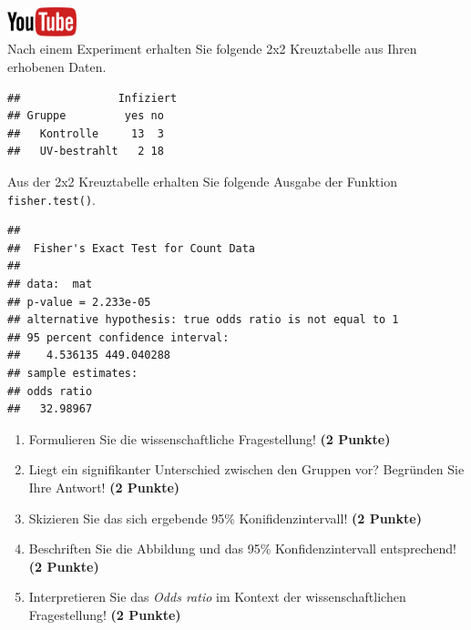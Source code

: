 \documentclass[a4paper, 9pt]{scrartcl}\usepackage[]{graphicx}\usepackage[]{xcolor}
\makeatletter
\newenvironment{kframe}{%
 \def\at@end@of@kframe{}%
 \ifinner\ifhmode%
  \def\at@end@of@kframe{\end{minipage}}%
  \begin{minipage}{\columnwidth}%
 \fi\fi%
 \def\FrameCommand##1{\hskip\@totalleftmargin \hskip-\fboxsep
 \colorbox{shadecolor}{##1}\hskip-\fboxsep
     \hskip-\linewidth \hskip-\@totalleftmargin \hskip\columnwidth}%
 \MakeFramed {\advance\hsize-\width
   \@totalleftmargin\z@ \linewidth\hsize
   \@setminipage}}%
 {\par\unskip\endMakeFramed%
 \at@end@of@kframe}
\newenvironment{knitrout}{}{} %
\makeatother
\begin{document}
\hfill\href{https://youtu.be/ghArbetOr_E}{\includegraphics[width =
  2cm]{img/youtube}}\\[1Ex]

Nach einem Experiment erhalten Sie folgende 2x2 Kreuztabelle aus Ihren
erhobenen Daten.

\begin{knitrout}
\color{fgcolor}\begin{kframe}
\begin{verbatim}
##               Infiziert
## Gruppe         yes no
##   Kontrolle     13  3
##   UV-bestrahlt   2 18
\end{verbatim}
\end{kframe}
\end{knitrout}

Aus der 2x2 Kreuztabelle erhalten Sie folgende \Rlogo Ausgabe der Funktion
\texttt{fisher.test()}.

\begin{knitrout}
\color{fgcolor}\begin{kframe}
\begin{verbatim}
## 
## 	Fisher's Exact Test for Count Data
## 
## data:  mat
## p-value = 2.233e-05
## alternative hypothesis: true odds ratio is not equal to 1
## 95 percent confidence interval:
##    4.536135 449.040288
## sample estimates:
## odds ratio 
##   32.98967
\end{verbatim}
\end{kframe}
\end{knitrout}


\begin{enumerate}
\item Formulieren Sie die wissenschaftliche Fragestellung! \textbf{(2 Punkte)}
\item Liegt ein signifikanter Unterschied zwischen den Gruppen vor?
  Begr{\"u}nden Sie Ihre Antwort! \textbf{(2 Punkte)}
\item Skizieren Sie das sich ergebende 95\% Konifidenzintervall! \textbf{(2 Punkte)}
\item Beschriften Sie die Abbildung und
  das 95\% Konfidenzintervall entsprechend! \textbf{(2 Punkte)} 
\item Interpretieren Sie das \textit{Odds ratio} im Kontext der
  wissenschaftlichen Fragestellung! \textbf{(2 Punkte)} 
\end{enumerate}
 
\end{document}
